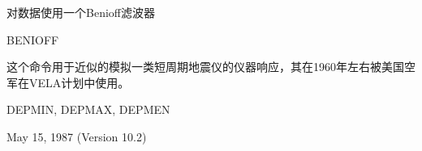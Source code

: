 \label{cmd:benioff}

对数据使用一个Benioff滤波器

BENIOFF

这个命令用于近似的模拟一类短周期地震仪的仪器响应，其在1960年左右被美国空军在VELA计划中使用。

DEPMIN, DEPMAX, DEPMEN

May 15, 1987 (Version 10.2)
